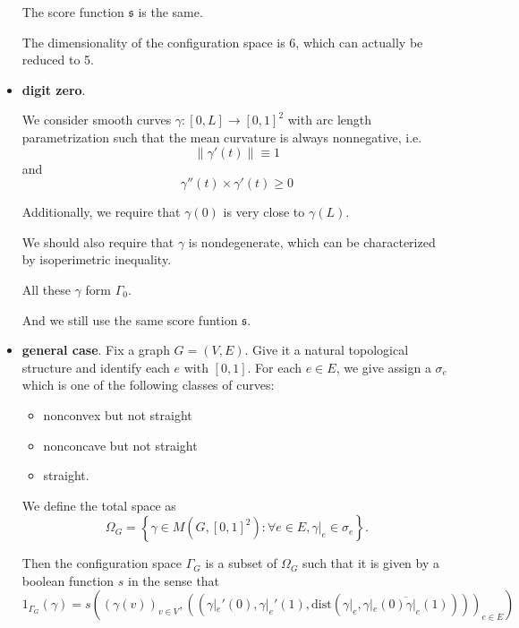 \documentclass[11pt, oneside]{article}   	%
\theoremstyle{definition}
\begin{document}
\begin{itemize}
The score function $\mathfrak{s}$ is the same.

The dimensionality of the configuration space is 6, which can actually be reduced to 5.

\item \textbf{digit zero}.

We consider smooth curves $\gamma:[0,L]\to [0,1]^2$ with arc length parametrization such that the mean curvature is always nonnegative, i.e.
\begin{equation}
	\|\gamma'(t)\|\equiv 1
\end{equation}
and
\begin{equation}
	\gamma''(t)\times \gamma'(t) \ge 0
\end{equation}

Additionally, we require that $\gamma(0)$ is very close to $\gamma(L)$.

We should also require that $\gamma$ is nondegenerate, which can be characterized by isoperimetric inequality.

All these $\gamma$ form $\Gamma_0$.

And we still use the same score funtion $\mathfrak{s}$.

\item \textbf{general case}. Fix a graph $G=(V,E)$. Give it a natural topological structure and identify each $e$ with $[0,1]$. For each $e\in E$, we give assign a $\sigma_e$ which is one of the following classes of curves:

\begin{itemize}
	\item nonconvex but not straight
	\item nonconcave but not straight
	\item straight.
\end{itemize}

We define the total space as
\begin{equation}
	\Omega_G = \left\{\gamma\in M(G, [0,1]^2): \forall e\in E, \gamma|_e\in \sigma_e\right\}.
\end{equation}

Then the configuration space $\Gamma_G$ is a subset of $\Omega_G$ such that it is given by a boolean function $s$ in the sense that
\begin{equation}
	1_{\Gamma_G}(\gamma)=s((\gamma(v))_{v\in V},((\gamma|_e'(0), \gamma|_e'(1), \text{dist}(\gamma|_e,\overline{\gamma|_e(0)\gamma|_e(1)})))_{e\in E})
\end{equation}
\end{itemize}
\end{document}
